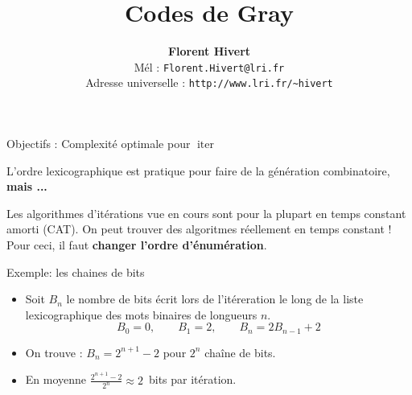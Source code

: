 \documentclass{beamer}
\title[Codes de Gray combinatoires]%
{\bf Codes de Gray}
\author{\textbf{\Large Florent Hivert}\\[5mm]
  Mél : \texttt{Florent.Hivert@lri.fr}\\
  Adresse universelle : \texttt{http://www.lri.fr/\~{ }hivert}
}
\date{}
\def\red{\color{red}}
\def\green{\color{green}}
\def\opstyle#1{\ensuremath{\operatorname{#1}}}
\begin{document}
\newcommand{\Count}{\opstyle{count}}
\newcommand{\List}{\opstyle{list}}
\newcommand{\Iter}{\opstyle{iter}}
\newcommand{\Unrank}{\opstyle{unrank}}
\newcommand{\Rank}{\opstyle{rank}}
\newcommand{\First}{\opstyle{first}}
\newcommand{\Next}{\opstyle{next}}
\newcommand{\Random}{\opstyle{random}}

\newcommand{\Concat}{\opstyle{concat}}
\newcommand{\BS}{\opstyle{BitString}}
\newcommand{\Perm}{\opstyle{Perm}}
\newcommand{\Union}{\opstyle{Union}}
\newcommand{\Prod}{\opstyle{Prod}}

\newcommand{\Pos}{\opstyle{Pos}}
\newcommand{\Bin}{\opstyle{Bin}}
\newcommand{\Gray}{\opstyle{Gray}}

\newcommand{\mA}{\mathcal{A}}
\newcommand{\mB}{\mathcal{B}}
\newcommand{\mC}{\mathcal{C}}
\newcommand{\mD}{\mathcal{D}}
\newcommand{\mE}{\mathcal{E}}
\newcommand{\mI}{\mathcal{I}}
\newcommand{\mZ}{\mathcal{Z}}

\newcommand{\Oh}{O}

\frame{\titlepage}
\begin{frame}{Objectifs : Complexité optimale pour $\Iter$}

  L'ordre lexicographique est pratique pour faire de la génération
  combinatoire, \textbf{mais ...}
  \bigskip

  \begin{NOTE}
    Les algorithmes d'itérations vue en cours sont pour la plupart en {\red
      temps constant amorti} (CAT). On peut trouver des algoritmes réellement
    en {\green temps constant} ! Pour ceci, il faut \textbf{changer l'ordre
      d'énumération}.
  \end{NOTE}
\end{frame}

\begin{frame}{Exemple: les chaines de bits}

  \begin{itemize}
  \item Soit $B_n$ le nombre de bits écrit lors de l'itéreration le long de la
    liste lexicographique des mots binaires de longueurs $n$.
  \[B_0 = 0,\qquad B_1=2,\qquad B_{n} = 2B_{n-1}+2\]
  \bigskip\pause

  \item On trouve : $B_n = 2^{n+1} - 2$ pour $2^n$ chaîne de bits.
  \bigskip\pause

  \item En moyenne $\frac{2^{n+1} - 2}{2^n}\approx 2$~bits par itération.
  \end{itemize}
\end{frame}
\end{document}
